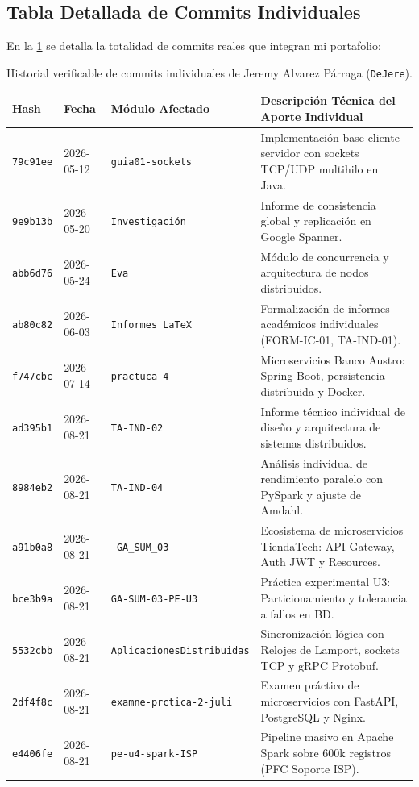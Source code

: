 \documentclass[11pt,a4paper]{article}
\begin{document}
\subsection{Tabla Detallada de Commits Individuales}
En la \cref{tab:commits_verificables} se detalla la totalidad de commits reales que integran mi portafolio:

\begin{table}[H]
    \centering
    \footnotesize
    \caption{Historial verificable de commits individuales de Jeremy Alvarez Párraga (\texttt{DeJere}).}
    \label{tab:commits_verificables}
    \renewcommand{\arraystretch}{1.18}
    \begin{tabularx}{\textwidth}{lp{1.8cm}p{4.0cm}X}
        \toprule
        \textbf{Hash} & \textbf{Fecha} & \textbf{Módulo Afectado} & \textbf{Descripción Técnica del Aporte Individual} \\
        \midrule
        \texttt{79c91ee} & 2026-05-12 & \texttt{guia01-sockets} & Implementación base cliente-servidor con sockets TCP/UDP multihilo en Java. \\
        \texttt{9e9b13b} & 2026-05-20 & \texttt{Investigación} & Informe de consistencia global y replicación en Google Spanner. \\
        \texttt{abb6d76} & 2026-05-24 & \texttt{Eva} & Módulo de concurrencia y arquitectura de nodos distribuidos. \\
        \texttt{ab80c82} & 2026-06-03 & \texttt{Informes LaTeX} & Formalización de informes académicos individuales (FORM-IC-01, TA-IND-01). \\
        \texttt{f747cbc} & 2026-07-14 & \texttt{practuca 4} & Microservicios Banco Austro: Spring Boot, persistencia distribuida y Docker. \\
        \texttt{ad395b1} & 2026-08-21 & \texttt{TA-IND-02} & Informe técnico individual de diseño y arquitectura de sistemas distribuidos. \\
        \texttt{8984eb2} & 2026-08-21 & \texttt{TA-IND-04} & Análisis individual de rendimiento paralelo con PySpark y ajuste de Amdahl. \\
        \texttt{a91b0a8} & 2026-08-21 & \texttt{-GA\_SUM\_03} & Ecosistema de microservicios TiendaTech: API Gateway, Auth JWT y Resources. \\
        \texttt{bce3b9a} & 2026-08-21 & \texttt{GA-SUM-03-PE-U3} & Práctica experimental U3: Particionamiento y tolerancia a fallos en BD. \\
        \texttt{5532cbb} & 2026-08-21 & \texttt{AplicacionesDistribuidas} & Sincronización lógica con Relojes de Lamport, sockets TCP y gRPC Protobuf. \\
        \texttt{2df4f8c} & 2026-08-21 & \texttt{examne-prctica-2-juli} & Examen práctico de microservicios con FastAPI, PostgreSQL y Nginx. \\
        \texttt{e4406fe} & 2026-08-21 & \texttt{pe-u4-spark-ISP} & Pipeline masivo en Apache Spark sobre 600k registros (PFC Soporte ISP). \\
        \bottomrule
    \end{tabularx}
\end{table}
\end{document}
